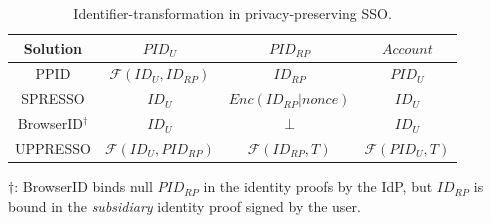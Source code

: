 \begin{table}[tb]
\scriptsize
    \caption{Identifier-transformation in privacy-preserving SSO.}
    \centering
    \setlength{\tabcolsep}{1.2mm}
    \begin{tabular}{|c|c|c|c|}
    \hline
    {\textbf{Solution}} & {\textbf{$PID_{U}$}} & {\textbf{$PID_{RP}$}} & {\textbf{$Account$}}\\
    \hline
    {PPID} & {{$\mathcal{F}(ID_U,ID_{RP})$}} & {{$ID_{RP}$}} & {{$PID_U$}}\\
    \hline
    {SPRESSO} & {{$ID_U$}} & {{$Enc(ID_{RP}|nonce)$}} &{{$ID_U$}}\\
    \hline
    {BrowserID$^\dag$} & {{$ID_U$}} & {{$\bot$}} &{{$ID_U$}}\\
    \hline
    {UPPRESSO} & {{$\mathcal{F}(ID_U, PID_{RP})$}} & {{$\mathcal{F}(ID_{RP}, T)$}} &{{$\mathcal{F}(PID_U, T)$}}\\
    \hline
    \end{tabular}
\flushleft
{\footnotesize
$\dag$: BrowserID binds null $PID_{RP}$ in the identity proofs by the IdP,
    but $ID_{RP}$ is bound in the \emph{subsidiary} identity proof signed by the user.}
    \label{tbl:compare}
    \vspace{-5mm}
\end{table}



%

